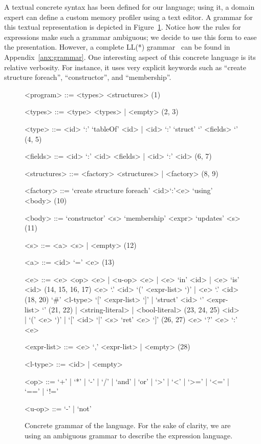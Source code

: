 A textual concrete syntax has been defined for our language; using it, a domain expert can define a custom memory profiler using a text editor.
A grammar for this textual representation is depicted in Figure~\ref{fig:dsl-grammar}.
Notice how the rules for expressions make such a grammar ambiguous; we decide to use this form to ease the presentation.
However, a complete LL(*) grammar~\cite{Parr:2011:LFA:1993498.1993548} can be found in Appendix~\ref{anx:grammar}.
One interesting aspect of this concrete language is its relative verbosity.
For instance, it uses very explicit keywords such as ``create structure foreach'', ``constructor'', and ``membership''.


{
\scriptsize
\begin{figure}[!ht]
\begin{mdframed}[outermargin=0.2cm, innermargin=0.5cm]

\newcommand{\grule}[1]{\hfill{\scriptsize (#1)}}
\setlength{\grammarindent}{4em}
\begin{grammar}

<program> ::= <types> <structures> \grule{1}

<types> ::= <type> <types> | <empty> \grule{2, 3}

<type> ::= <id> `:' `tableOf' <id> | <id> `:' `struct' `{' <fields> `}' \grule{4, 5}

<fields> ::= <id> `:' <id> <fields> | <id> `:' <id> \grule{6, 7}

<structures> ::= <factory> <structures> | <factory> \grule{8, 9}

<factory> ::= `create structure foreach' <id>`:'<e> `using' <body> \grule{10}

<body> ::= `constructor' <s> `membership' <expr> `updates' <s> \grule{11}

<s> ::= <a> <s> | <empty> \grule{12}

<a> ::= <id> `=' <e>  \grule{13} 

<e> ::= <e> <op> <e> | <u-op> <e> | <e> `in' <id> | <e> `is' <id> \grule{14, 15, 16, 17}
\alt <e> `.' <id> `(' <expr-list> `)' | <e> `.' <id> \grule{18, 20}
\alt `#' <l-type> `[' <expr-list> `]' | `struct' <id> `{' <expr-list> `}' \grule{21, 22}
 | <string-literal> | <bool-literal> \grule{23, 24, 25}
\alt <id> | `(' <e> `)' | `[' <id> `|' <s> `ret' <e> `]' \grule{26, 27}
\alt <e> `?' <e> `:' <e>

<expr-list> ::= <e> `,' <expr-list> | <empty>  \grule{28}

<l-type> ::= <id> | <empty>

<op> ::= `+' | `*' | `-' | `/' | `and' | `or' | `>' | `<' | `>=' | `<=' | `==' | `!='

<u-op> ::= `-' | `not'

\end{grammar}
\end{mdframed}
\caption{Concrete grammar of the language. For the sake of clarity, we are using an ambiguous grammar to describe the expression language.} \label{fig:dsl-grammar}
\end{figure}
}


